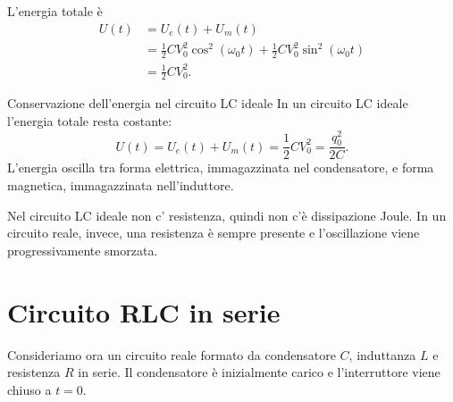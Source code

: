 \documentclass[a4paper]{article}
\begin{document}
L'energia totale è
\begin{align*}
U(t)
&=U_e(t)+U_m(t) \\
&=\frac{1}{2}CV_0^2\cos^2(\omega_0t)+\frac{1}{2}CV_0^2\sin^2(\omega_0t) \\
&=\frac{1}{2}CV_0^2.
\end{align*}

\begin{snippettheorem}{Conservazione dell'energia nel circuito LC ideale}
In un circuito LC ideale l'energia totale resta costante:
\[
    U(t)=U_e(t)+U_m(t)=\frac{1}{2}CV_0^2=\frac{q_0^2}{2C}.
\]
L'energia oscilla tra forma elettrica, immagazzinata nel condensatore, e forma magnetica, immagazzinata nell'induttore.
\end{snippettheorem}

\begin{center}
\end{center}

Nel circuito LC ideale non c' resistenza, quindi non c'è dissipazione Joule. In un circuito reale, invece, una resistenza è sempre presente e l'oscillazione viene progressivamente smorzata.

\section{Circuito RLC in serie}

Consideriamo ora un circuito reale formato da condensatore \(C\), induttanza \(L\) e resistenza \(R\) in serie. Il condensatore è inizialmente carico e l'interruttore viene chiuso a \(t=0\).

\begin{center}
\end{center}
\end{document}

